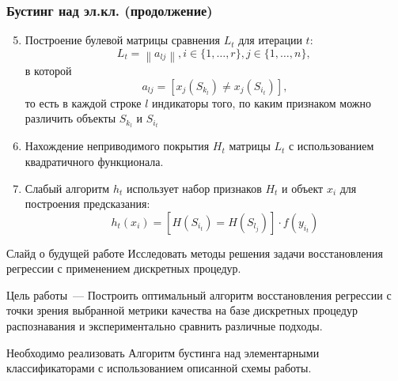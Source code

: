 \documentclass[10pt,pdf,unicode,aspectratio=169]{beamer}
\begin{document}
\begin{frame}
\frametitle{Бустинг над эл.кл. (продолжение)}
\begin{enumerate}
    \setcounter{enumi}{4}
    \item Построение булевой матрицы сравнения \(L_t\) для итерации \(t\):
    $$
    L_{t}=\left\|a_{l j}\right\|, i \in\{1, \ldots, r\}, j \in\{1, \ldots, n\} \text {, }
    $$
    в которой
    $$
    a_{l j}=\left[x_{j}\left(S_{k_{l}}\right) \neq x_{j}\left(S_{i_{t}}\right)\right],
    $$
    то есть в каждой строке $l$ индикаторы того, по каким признаком можно различить объекты $S_{k_{l}}$ и $S_{i_{t}}$
    \item Нахождение неприводимого покрытия \(H_t\) матрицы \(L_t\) с использованием квадратичного функционала.
    \item Слабый алгоритм \(h_t\) использует набор признаков \(H_t\) и объект \(x_i\) для построения предсказания:
   \[h_t(x_i) = [H(S_{i_t}) = H(S_{l_j})] \cdot f(y_{i_t})\]
\end{enumerate}
\end{frame}











\begin{frame}{Слайд о будущей работе}
\bigskip
Исследовать методы решения задачи восстановления регрессии с применением дискретных процедур.

\begin{block}{Цель работы~---}
Построить оптимальный алгоритм восстановления регрессии с точки зрения выбранной метрики качества на базе дискретных процедур распознавания и экспериментально сравнить различные подходы.
\end{block}
\begin{block}{Необходимо реализовать}
Алгоритм бустинга над элементарными классификаторами с использованием описанной схемы работы.
\end{block}

\end{frame}
\end{document}
